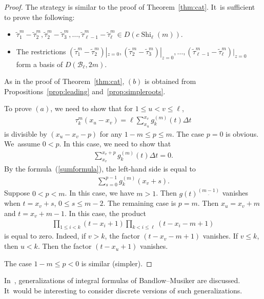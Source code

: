 \documentclass[10pt,a4paper]{amsart}
\numberwithin{equation}{section}
\newcommand{\B}{\mathcal{B}}
\newcommand{\Shi}{\operatorname{Shi}}
\newcommand{\sint}{\sum\nolimits}
\begin{document}
\begin{proof}
The strategy is similar to the proof of Theorem~\ref{thm:cat}. It~is sufficient to prove the
following:
\begin{itemize}\itemsep=0pt
\item[$(a)$]
$\widetilde{\tau}_1^m-\widetilde{\tau}_2^m, \widetilde{\tau}_2^m-\widetilde{\tau}_3^m, \dots,
\widetilde{\tau}_{\ell-1}^m-\widetilde{\tau}_\ell^m\in D(c\Shi_\ell(m))$.
\item[$(b)$]
The restrictions
$(\widetilde{\tau}_1^m-\widetilde{\tau}_2^m)|_{z=0},
(\widetilde{\tau}_2^m-\widetilde{\tau}_3^m)|_{z=0}, \dots,
(\widetilde{\tau}_{\ell-1}^m-\widetilde{\tau}_\ell^m)|_{z=0}$
form a basis of $D(\B_\ell, 2m)$.
\end{itemize}
As in the proof of Theorem~\ref{thm:cat}, $(b)$ is obtained from
Propositions~\ref{prop:leading} and~\ref{prop:simpleroots}.

To prove $(a)$, we need to show that for $1\leq u<v\leq \ell$,
\begin{gather*}
\tau_k^m(x_u-x_v)=\ell\sint_{x_u}^{x_v}g_k^{(m)}(t) \Delta t
\end{gather*}
is divisible by $(x_u-x_v-p)$ for any $1-m\leq p\leq m$.
The case $p=0$ is obvious. We~assume $0<p$. In this case, we need
to show that
\begin{gather*}
\sint_{x_v}^{x_v+p}g_k^{(m)}(t) \Delta t=0.
\end{gather*}
By the formula~(\ref{sumformula}), the left-hand side is equal to
\begin{gather*}
\sum_{s=0}^{p-1}g_k^{(m)}(x_v+s).
\end{gather*}
Suppose $0<p<m$. In this case, we have $m>1$. Then
$g(t)^{\underline{(m-1)}}$ vanishes when $t=x_v+s$, $0\leq s\leq m-2$.
The remaining case is $p=m$. Then $x_u=x_v+m$ and $t=x_v+m-1$.
In this case, the product
\begin{gather*}
\prod_{1\leq i<k}(t-x_i+1)
\prod_{k<i\leq\ell}(t-x_i-m+1)
\end{gather*}
is equal to zero. Indeed, if $v>k$, the factor $(t-x_v-m+1)$ vanishes.
If $v\leq k$, then $u<k$. Then the factor $(t-x_u+1)$ vanishes.

The case $1-m\leq p<0$ is similar (simpler).
\end{proof}


\begin{Remark}
In~\cite{tsu}, generalizations of integral formulas of
Bandlow--Musiker are discussed. It~would be interesting to
consider discrete versions of such generalizations.
\end{Remark}
\end{document}
